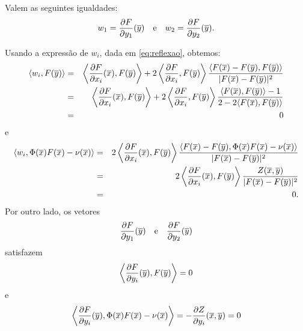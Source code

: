 \begin{lema}
	Valem as seguintes igualdades:
	\begin{equation*}
	w_1 = \frac{\partial F}{\partial y_1}(\overline{y}) 
	\quad \text{e} \quad 
	w_2 = \frac{\partial F}{\partial y_2}(\overline{y}).
	\end{equation*}
\end{lema}
\begin{demonstracao}
	Usando a express\~ao de $w_i$, dada em \eqref{eq:reflexao}, obtemos:
	\begin{eqnarray*}
		\langle w_i, F(\overline{y}) \rangle &=& \left\langle \frac{\partial F}{\partial x_i}(\overline{x}), F(\overline{y}) \right\rangle + 2 \left\langle \frac{\partial F}{\partial x_i}, F(\overline{y}) \right\rangle \frac{\langle F(\overline{x}) - F(\overline{y}),F(\overline{y}) \rangle}{| F(\overline{x}) - F(\overline{y}) |^2} \\
		&=& \left\langle \frac{\partial F}{\partial x_i}(\overline{x}), F(\overline{y}) \right\rangle 
		+ 2 \left\langle \frac{\partial F}{\partial x_i}, F(\overline{y}) \right\rangle \frac{\langle F(\overline{x}),F(\overline{y}) \rangle - 1}{2 - 2 \langle F(\overline{x}), F(\overline{y}) \rangle} \\
		&=& 0
	\end{eqnarray*}
	e
	\begin{eqnarray*}
		\langle w_i, \Phi(\overline{x}) F(\overline{x}) - \nu(\overline{x}) \rangle &=&
		2 \left\langle \frac{\partial F}{\partial x_i}(\overline{x}), F(\overline{y}) \right\rangle \frac{\langle F(\overline{x}) - F(\overline{y}), \Phi(\overline{x}) F(\overline{x}) - \nu(\overline{x}) \rangle}{| F(\overline{x}) - F(\overline{y}) |^2} \\
		& = & 2 \left\langle \frac{\partial F}{\partial x_i}(\overline{x}), F(\overline{y}) \right\rangle \frac{Z(\overline{x},\overline{y})}{| F(\overline{x}) - F(\overline{y}) |^2} \\
		& = & 0.
	\end{eqnarray*}
	Por outro lado, os vetores
	\begin{equation*}
	\frac{\partial F}{\partial y_1}(\overline{y}) \quad \text{e} \quad \frac{\partial F}
	{\partial y_2}(\overline{y})
	\end{equation*}
	satisfazem
	\begin{equation*}
	\left\langle \frac{\partial F}{\partial y_i}(\overline{y}), F(\overline{y})\right\rangle = 0
	\end{equation*}
	e
	\begin{equation*}
	\left\langle \frac{\partial F}{\partial y_i}(\overline{y}), \Phi(\overline{x}) F(\overline{x}) - 
	\nu(\overline{x}) \right\rangle = -\frac{\partial Z}{\partial y_i}(\overline{x},\overline{y}) 
	= 0
	\end{equation*}

\end{demonstracao}
